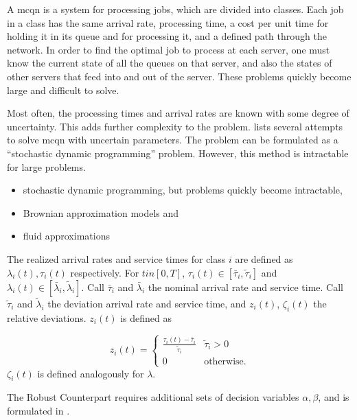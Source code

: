\documentclass[11pt,a4paper,titlepage]{article}
\theoremstyle{definition}
\theoremstyle{plain}
\begin{document}
A \gls{mcqn} is a system for processing jobs,
which are divided into classes.
Each job in a class has the same arrival rate,
processing time,
a cost per unit time for holding it in its queue and for processing it,
and a defined path through the network.
In order to find the optimal job to process at each server,
one must know the current state of all the queues on that server,
and also the states of other servers that feed into and out of the server.
These problems quickly become large and difficult to solve.

Most often,
the processing times and arrival rates are known with some degree of uncertainty.
This adds further complexity to the problem.
\autocite{bertsimas2014robust} lists several attempts to solve \gls{mcqn} with uncertain parameters.
The problem can be formulated as a ``stochastic dynamic programming'' problem.
However,
this method is intractable for large problems.


\begin{itemize}
    \item stochastic dynamic programming,
    but problems quickly become intractable,
    \item Brownian approximation models and
    \item fluid approximations
\end{itemize}

The realized arrival rates and service times for class $i$ are
defined as $\lambda_i(t), \tau_i(t)$ respectively.
For $t in [0,T]$,
$\tau_i(t) \in [\bar{\tau}_i, \tilde{\tau}_i]$ and
$\lambda_i(t) \in [\bar{\lambda}_i, \tilde{\lambda}_i]$.
Call $\bar{\tau}_i$ and $\bar{\lambda}_i$ the nominal arrival rate and service time.
Call $\tilde{\tau}_i$ and $\tilde{\lambda}_i$ the deviation arrival rate and service time,
and $z_i(t)$, $\zeta_i(t)$ the relative deviations.
$z_i(t)$ is defined as

\begin{equation}
    z_i(t) =
    \begin{cases}
        \frac{\tau_i(t) - \bar{\tau}_i}{\tilde{\tau}_i} & \tilde{\tau}_i > 0 \\
        0 & \text{otherwise.}
    \end{cases}
\end{equation}
$\zeta_i(t)$ is defined analogously for $\lambda$.


The Robust Counterpart requires additional sets of decision variables
$\alpha, \beta$,
and is formulated in .
\end{document}
